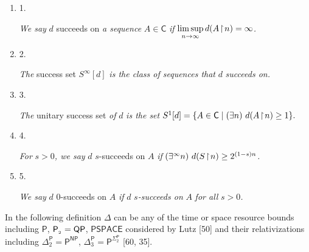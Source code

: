 \documentclass[10pt,a4paper]{article}
\begin{document}
\begin{enumerate}


\item[] 
1. 


\emph{We say }$d$\emph{ }succeeds on\emph{ a sequence }$A\in\mathsf{C}$\emph{ if }$\limsup\limits_{n\to\infty}d(A\negthinspace\upharpoonright\negthinspace n)=\infty$\emph{.}\par





\item[] 
2. 


\emph{The }success set\emph{ }$S^{\infty}[d]$\emph{ is the class of sequences that }$d$\emph{ succeeds on.}\par





\item[] 
3. 


\emph{The }unitary success set\emph{ of }$d$\emph{ is the set
}$S^{1}[d]=\{A\in\mathsf{C}\mid(\exists n)\ d(A\negthinspace\upharpoonright\negthinspace n)\geq 1\}.$\emph{}\par





\item[] 
4. 


\emph{For }$s>0$\emph{, we say }$d$\emph{ }$s$-succeeds on\emph{ }$A$\emph{ if }$(\exists^{\infty}n)\ d(S\negthinspace\upharpoonright\negthinspace n)\geq 2^{(1-s)n}$\emph{.}\par





\item[] 
5. 


\emph{We say }$d$\emph{ }$0$-succeeds on\emph{ }$A$\emph{ if }$d$\emph{ }$s$\emph{-succeeds on }$A$\emph{ for all }$s>0$\emph{.}\par





\end{enumerate}






In the following definition $\Delta$ can be any of the time or space resource bounds including $\mathsf{P}$, ${\mathsf{P}_{\thinspace\negthinspace{}_{2}}}=\mathsf{QP}$, $\mathsf{PSPACE}$ considered by Lutz [50] and their relativizations including ${\Delta^{\mathsf{P}}_{2}}=\mathsf{P}^{\mathsf{NP}}$, ${\Delta^{\mathsf{P}}_{3}}=\mathsf{P}^{\Sigma^{\mathsf{P}}_{2}}$ [60, 35].\par
\end{document}
